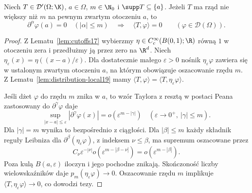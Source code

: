 \begin{lemat}
\label{lem:dt-point-support-jet}
Niech $T\in\mathcal D'(\Omega;\K)$, $a\in\Omega$,
$m\in\N_0$ i $\supp T\subseteq\{a\}$.
Jeżeli $T$ ma rząd nie większy niż $m$ na pewnym zwartym
otoczeniu $a$, to
\[
 \partial^\alpha\varphi(a)=0\quad(|\alpha|\le m)
 \quad\Longrightarrow\quad
 \langle T,\varphi\rangle=0
 \qquad(\varphi\in\mathcal D(\Omega)).
\]
\end{lemat}
\begin{proof}
Z Lematu~\ref{lem:cutoffs17} wybierzmy
$\eta\in C_c^\infty(B(0,1);\R)$ równą $1$
w otoczeniu zera i przedłużmy ją przez zero na $\R^d$.
Niech $\eta_\varepsilon(x)=\eta((x-a)/\varepsilon)$.
Dla dostatecznie małego $\varepsilon>0$ nośnik
$\eta_\varepsilon\varphi$ zawiera się w ustalonym
zwartym otoczeniu $a$, na którym obowiązuje
oszacowanie rzędu $m$.
Z Lematu~\ref{lem:distribution-local19} mamy
$\langle T,\varphi\rangle=\langle T,\eta_\varepsilon\varphi\rangle$.

Jeśli dżet $\varphi$ do rzędu $m$ znika w $a$, to
wzór Taylora z resztą w postaci Peana zastosowany do
$\partial^\gamma\varphi$ daje
\[
 \sup_{|x-a|\le\varepsilon}|\partial^\gamma\varphi(x)|
 =o(\varepsilon^{m-|\gamma|})\quad
 (\varepsilon\to0^+,\ |\gamma|\le m).
\]
Dla $|\gamma|=m$ wynika to bezpośrednio z ciągłości.
Dla $|\beta|\le m$ każdy składnik reguły Leibniza
dla $\partial^\beta(\eta_\varepsilon\varphi)$,
z indeksem $\nu\le\beta$, ma supremum oszacowane przez
\[
 C_\nu\varepsilon^{-|\nu|}
 o(\varepsilon^{m-|\beta-\nu|})
 =o(\varepsilon^{m-|\beta|}).
\]
Poza kulą $B(a,\varepsilon)$ iloczyn i jego pochodne
znikają. Skończoność liczby wielowskaźników daje
$p_m(\eta_\varepsilon\varphi)\to0$.
Oszacowanie rzędu $m$ implikuje
$\langle T,\eta_\varepsilon\varphi\rangle\to0$,
co dowodzi tezy.
\end{proof}

